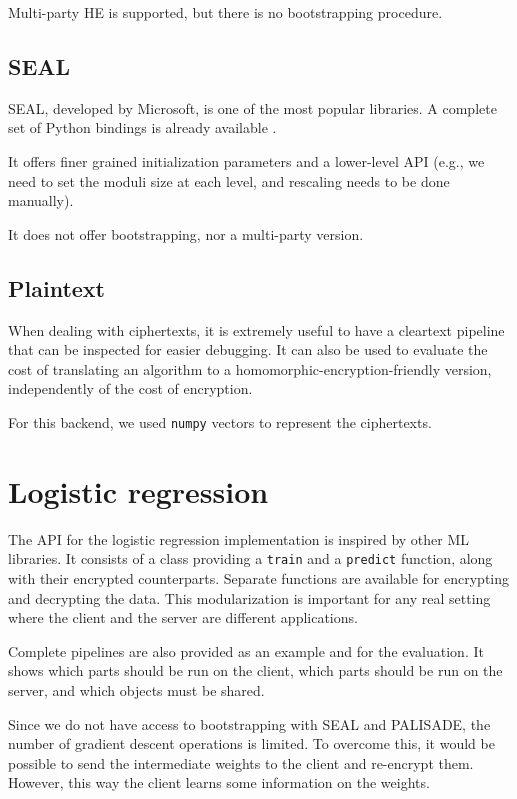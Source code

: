 \documentclass[a4paper,11pt,oneside]{report}
\begin{document}
Multi-party HE is supported, but there is no bootstrapping procedure.

\subsection{SEAL}

SEAL, developed by Microsoft, is one of the most popular libraries. 
A complete set of Python bindings is already available \cite{hugang_seal-python_2022}.

It offers finer grained initialization parameters and a lower-level API (e.g., we need to set the moduli size at each level, and rescaling needs to be done manually).

It does not offer bootstrapping, nor a multi-party version.

\subsection{Plaintext}

When dealing with ciphertexts, it is extremely useful to have a cleartext pipeline that can be inspected for easier debugging. 
It can also be used to evaluate the cost of translating an algorithm to a homomorphic-encryption-friendly version, independently of the cost of encryption. 

For this backend, we used \texttt{numpy} vectors to represent the ciphertexts.

\section{Logistic regression}

The API for the logistic regression implementation is inspired by other ML libraries. 
It consists of a class providing a \texttt{train} and a \texttt{predict} function, along with their encrypted counterparts. 
Separate functions are available for encrypting and decrypting the data. 
This modularization is important for any real setting where the client and the server are different applications.

Complete pipelines are also provided as an example and for the evaluation.
It shows which parts should be run on the client, which parts should be run on the server, and which objects must be shared.

Since we do not have access to bootstrapping with SEAL and PALISADE, the number of gradient descent operations is limited. 
To overcome this, it would be possible to send the intermediate weights to the client and re-encrypt them. 
However, this way the client learns some information on the weights.
\end{document}
